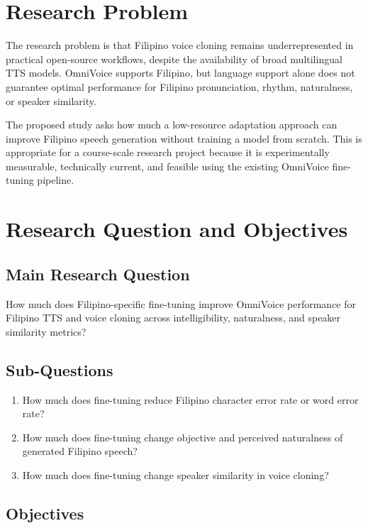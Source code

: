 \documentclass[11pt]{article}
\begin{document}
\section{Research Problem}

The research problem is that Filipino voice cloning remains underrepresented in practical open-source workflows, despite the availability of broad multilingual TTS models. OmniVoice supports Filipino, but language support alone does not guarantee optimal performance for Filipino pronunciation, rhythm, naturalness, or speaker similarity.

The proposed study asks how much a low-resource adaptation approach can improve Filipino speech generation without training a model from scratch. This is appropriate for a course-scale research project because it is experimentally measurable, technically current, and feasible using the existing OmniVoice fine-tuning pipeline.

\section{Research Question and Objectives}

\subsection{Main Research Question}

How much does Filipino-specific fine-tuning improve OmniVoice performance for Filipino TTS and voice cloning across intelligibility, naturalness, and speaker similarity metrics?

\subsection{Sub-Questions}

\begin{enumerate}
  \item How much does fine-tuning reduce Filipino character error rate or word error rate?
  \item How much does fine-tuning change objective and perceived naturalness of generated Filipino speech?
  \item How much does fine-tuning change speaker similarity in voice cloning?
\end{enumerate}

\subsection{Objectives}
\end{document}
